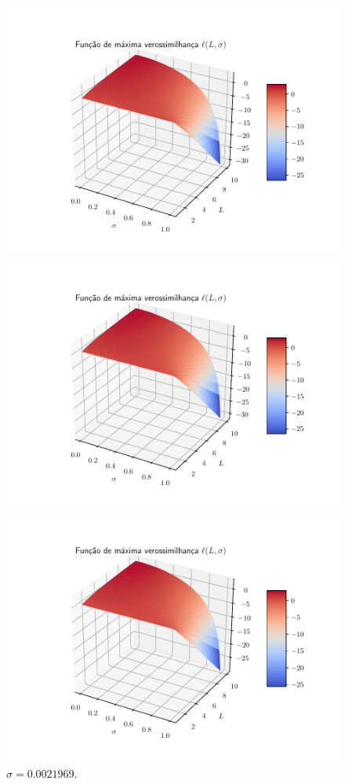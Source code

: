 \documentclass[journal,article,submit,moreauthors,pdftex]{Definitions/mdpi}
\begin{document}
\begin{figure}[hbt]
  \includegraphics[width=\linewidth]{funv_max_ver_j_10_flev_produto.pdf}
  	\caption{$\sigma= 0.0001241$.}\label{cap_acf_fig04}
\endminipage\hfill
{}
  \includegraphics[width=\linewidth]{funv_max_ver_j_20_flev_produto.pdf}
		\caption{$\sigma= 0.0021969$.}\label{cap_acf_fig05}
\endminipage\hfill
\centering
{}
  \includegraphics[width=\linewidth]{funv_max_ver_j_30_flev_produto.pdf}

\end{figure}
\end{document}
